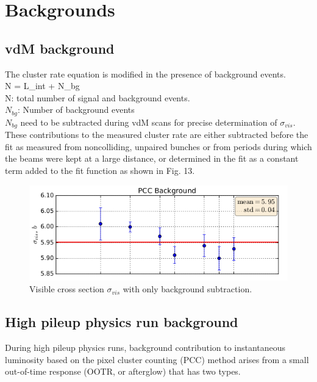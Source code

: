 \section{Backgrounds}
\label{sec:bkg}
\subsection{vdM background}

The cluster rate equation is modified in the presence of background events.\\

N = \sigma \:L_{int} + N_{bg} \\

N: total number of signal and background events. \\

$N_{bg}$: Number of background events \\

$N_{bg}$ need to be subtracted during vdM scans for precise determination of $\sigma_{vis}$. These contributions to the measured cluster rate are either subtracted before the fit as measured from noncolliding, unpaired bunches or from periods during which the beams were kept at a large distance, or determined in the fit as a constant term added to the fit function as shown in Fig. 13.

\begin{figure}[H]
  \centering
  \includegraphics[width=0.7\columnwidth]{./PCC_bg.png}
  \caption{ \onehalfspacing Visible cross section $\sigma_{vis}$ with only background subtraction.}
  \label{fig:CMS}
\end{figure}


\subsection{High pileup physics run background}

During high pileup physics runs, background contribution to instantaneous luminosity based on the pixel cluster counting (PCC) method arises from a small out-of-time response (OOTR, or afterglow) that has two types.\\

